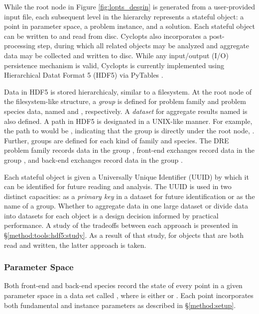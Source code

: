 While the root node in Figure \ref{fig:lopts_desgin} is generated from a
user-provided input file, each subsequent level in the hierarchy represents a
stateful object: a point in parameter space, a problem instance, and a
solution. Each stateful object can be written to and read from disc. Cyclopts
also incorporates a post-processing step, during which all related objects may
be analyzed and aggregate data may be collected and written to disc. While any
input/output (I/O) persistence mechanism is valid, Cyclopts is currently
implemented using Hierarchical Datat Format 5 (HDF5) \cite{hdf5} via PyTables
\cite{pytables}.

Data in HDF5 is stored hierarchicaly, similar to a filesystem. At the root node
of the filesystem-like structure, a \textit{group} is defined for problem family
and problem species data, named  and ,
respectively. A \textit{dataset} for aggregate results named  is
also defined. A path in HDF5 is designated in a UNIX-like manner. For example,
the path to  would be , indicating that the group is
directly under the root node, \code{/}. Further, groups are defined for each
kind of family and species. The DRE problem family records data in the group
, front-end exchanges record data in the group
, and back-end exchanges record data in the
group . 

Each stateful object is given a Universally Unique Identifier (UUID) by which it
can be identified for future reading and analysis. The UUID is used in two
distinct capacities: as a \textit{primary key} in a dataset for future
identification or as the name of a group. Whether to aggregate data in one large
dataset or divide data into datasets for each object is a design decision
informed by practical performance. A study of the tradeoffs between each
approach is presented in \S \ref{method:tools:hdf5:study}. As a result of that
study, for objects that are both read and written, the latter approach is taken.

\subsubsection{Parameter Space}

Both front-end and back-end species record the state of every point in a given
parameter space in a data set called ,
where  is either  or
. Each point incorporates both fundamental and instance
parameters as described in \S \ref{method:setup}.

